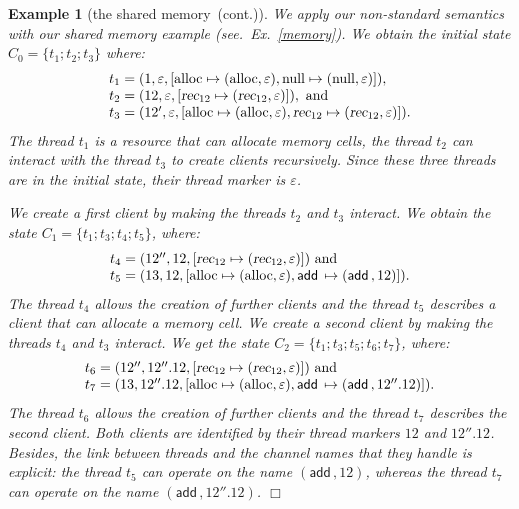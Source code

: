 \documentclass{article}
\newcommand{\boxexample}{$\Box$}
\newtheorem{example}[thm]{Example}
\newcommand{\globalname}[1]{\mathrm{#1}}
\newcommand{\data}[1]{\textsf{#1}\,}
\newcommand{\recur}[1]{{\textsl{#1}}}
\newcommand{\addinit}{\data{add}}
\newcommand{\ccreate}{\globalname{alloc}}
\newcommand{\cnull}{\globalname{null}}
\newcommand{\memlaba}{1}
\newcommand{\memlabl}{12}
\newcommand{\memlabm}{13}
\newcommand{\crec}{\recur{rec}}
\newcommand{\continued}{(cont.)}
\newcommand{\cnonunu}{\shareanalysis\ \continued}
\newcommand{\shareanalysis}{the shared memory}
\begin{document}
\begin{example}[\cnonunu]
We apply our non-standard semantics with our shared memory example (see.~Ex.~\ref{memory}). We obtain the initial state $C_0 = \{t_1;t_2;t_3\}$ where:
\begin{equation*}
\begin{array}{l}
t_1 = (\memlaba,\varepsilon,[\ccreate\mapsto(\ccreate,\varepsilon),\cnull\mapsto(\cnull,\varepsilon)]),\cr
t_2 = (\memlabl,\varepsilon,[\crec_{\memlabl}\mapsto(\crec_{\memlabl},\varepsilon)]), \text{ and} \cr
t_3= (\memlabl',\varepsilon,[\ccreate\mapsto(\ccreate,\varepsilon),\crec_{\memlabl}\mapsto(\crec_{\memlabl},\varepsilon)]).\cr
\end{array}
\end{equation*}
The thread $t_1$ is a resource that can allocate memory cells, the thread $t_2$ can interact with the thread $t_3$ to create clients recursively. Since these three  threads  are in the initial state, their thread marker is $\varepsilon$. 

We create a first client by making the threads $t_2$ and $t_3$ interact. 
We obtain the state $C_1 = \{t_1;t_3;t_4;t_5\}$, where:
\begin{equation*}
\begin{array}{l}
 t_4=(\memlabl'',\memlabl,[\crec_{\memlabl}\mapsto(\crec_{\memlabl},\varepsilon)]) \text{ and }\cr
t_5=(\memlabm,\memlabl,[\ccreate\mapsto(\ccreate,\varepsilon),\addinit\mapsto(\addinit,\memlabl)]).\cr
\end{array}
\end{equation*}
The thread $t_4$ 
allows the creation of further clients 
and the thread $t_5$ describes a client that can allocate a memory cell. 
We create a second client by making the threads $t_4$ and $t_3$ interact. 
We get the state $C_2 = \{t_1;t_3;t_5;t_6;t_7\}$, where:
\begin{equation*}
\begin{array}{l}
t_6=(\memlabl'',\memlabl''.\memlabl,[\crec_{\memlabl}\mapsto(\crec_{\memlabl},\varepsilon)]) \text{ and } \cr
t_7=(\memlabm,\memlabl''.\memlabl,[\ccreate\mapsto(\ccreate,\varepsilon),\addinit\mapsto(\addinit,\memlabl''.\memlabl)]).
\end{array}
\end{equation*}
The thread $t_6$ 
allows the creation of further clients 
and the thread $t_7$  describes the second  client. 
Both clients are identified by their thread markers $\memlabl$ and $\memlabl''.\memlabl$. Besides, the link between threads and the channel names that they handle is explicit: the thread $t_5$ can operate on the name $(\addinit,\memlabl)$, whereas the thread $t_7$ can operate on the name $(\addinit,\memlabl''.\memlabl)$.
\boxexample\end{example}
\end{document}
